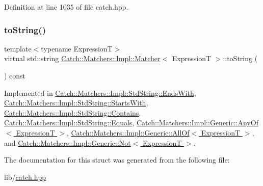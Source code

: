 Definition at line 1035 of file catch.\+hpp.

\hypertarget{struct_catch_1_1_matchers_1_1_impl_1_1_matcher_a091bcc37e589967d7e10fc7790d820e2}{}\label{struct_catch_1_1_matchers_1_1_impl_1_1_matcher_a091bcc37e589967d7e10fc7790d820e2} 
\subsubsection{\texorpdfstring{to\+String()}{toString()}}
{\footnotesize\ttfamily template$<$typename ExpressionT$>$ \\
virtual std\+::string \hyperlink{struct_catch_1_1_matchers_1_1_impl_1_1_matcher}{Catch\+::\+Matchers\+::\+Impl\+::\+Matcher}$<$ ExpressionT $>$\+::to\+String (\begin{DoxyParamCaption}{ }\end{DoxyParamCaption}) const\hspace{0.3cm}{\ttfamily [pure virtual]}}



Implemented in \hyperlink{struct_catch_1_1_matchers_1_1_impl_1_1_std_string_1_1_ends_with_a2a4675e3d2369d587af36f051fb7964f}{Catch\+::\+Matchers\+::\+Impl\+::\+Std\+String\+::\+Ends\+With}, \hyperlink{struct_catch_1_1_matchers_1_1_impl_1_1_std_string_1_1_starts_with_a85a24e2ac23025edbe31cbf5bb755fb3}{Catch\+::\+Matchers\+::\+Impl\+::\+Std\+String\+::\+Starts\+With}, \hyperlink{struct_catch_1_1_matchers_1_1_impl_1_1_std_string_1_1_contains_aed168ddff5bce9295aec5c7daca89849}{Catch\+::\+Matchers\+::\+Impl\+::\+Std\+String\+::\+Contains}, \hyperlink{struct_catch_1_1_matchers_1_1_impl_1_1_std_string_1_1_equals_ab0d73961b95d9836d77b9e2e94c3790b}{Catch\+::\+Matchers\+::\+Impl\+::\+Std\+String\+::\+Equals}, \hyperlink{class_catch_1_1_matchers_1_1_impl_1_1_generic_1_1_any_of_a331aaf012b133682eadc9ed5342f848a}{Catch\+::\+Matchers\+::\+Impl\+::\+Generic\+::\+Any\+Of$<$ Expression\+T $>$}, \hyperlink{class_catch_1_1_matchers_1_1_impl_1_1_generic_1_1_all_of_a8c8e7742501dc81e51a3c745d6f74119}{Catch\+::\+Matchers\+::\+Impl\+::\+Generic\+::\+All\+Of$<$ Expression\+T $>$}, and \hyperlink{class_catch_1_1_matchers_1_1_impl_1_1_generic_1_1_not_ab970a4a6e58a987451e0b0e0e60a0bff}{Catch\+::\+Matchers\+::\+Impl\+::\+Generic\+::\+Not$<$ Expression\+T $>$}.



The documentation for this struct was generated from the following file\+:\begin{DoxyCompactItemize}
\item 
lib/\hyperlink{catch_8hpp}{catch.\+hpp}\end{DoxyCompactItemize}
